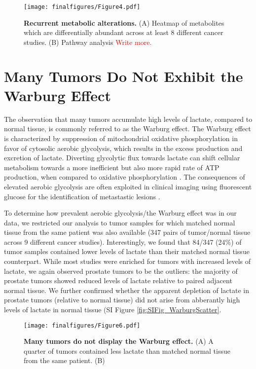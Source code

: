 \documentclass[10pt]{article}
\begin{document}
\begin{figure}[ht!]
  \centering
     \texttt{[image: finalfigures/Figure4.pdf]}
  \caption{\textbf{Recurrent metabolic alterations.} (A) Heatmap of metabolites which are differentially abundant across at least 8 different cancer studies. (B) Pathway analysis \textcolor{red}{Write more.}}
     \label{fig:Fig4}
\end{figure}

\section{Many Tumors Do Not Exhibit the Warburg Effect}
The observation that many tumors accumulate high levels of lactate, compared to normal tissue, is commonly referred to as the Warburg effect. The Warburg effect is characterized by suppression of mitochondrial oxidative phosphorylation in favor of cytosolic aerobic glycolysis, which results in the excess production and excretion of lactate. Diverting glycolytic flux towards lactate can shift cellular metabolism towards a more inefficient but also more rapid rate of ATP production, when compared to oxidative phosphorylation \cite{VanderHeiden2009}. The consequences of elevated aerobic glycolysis are often exploited in clinical imaging using fluorescent glucose for the identification of metastastic lesions \cite{CITE}.

To determine how prevalent aerobic glycolysis/the Warburg effect was in our data, we restricted our analysis to tumor samples for which matched normal tissue from the same patient was also available (347 pairs of tumor/normal tissue across 9 different cancer studies). Interestingly, we found that 84/347 (24\%) of tumor samples contained lower levels of lactate than their matched normal tissue counterpart. While most studies were enriched for tumors with increased levels of lactate, we again observed prostate tumors to be the outliers: the majority of prostate tumors showed reduced levels of lactate relative to paired adjacent normal tissue. We further confirmed whether the apparent depletion of lactate in prostate tumors (relative to normal tissue) did not arise from abberantly high levels of lactate in normal tissue (SI Figure \ref{fig:SIFig_WarburgScatter}. 

\begin{figure}[ht!]
  \centering
     \texttt{[image: finalfigures/Figure6.pdf]}
  \caption{\textbf{Many tumors do not display the Warburg effect.} (A) A quarter of tumors contained less lactate than matched normal tissue from the same patient. (B) }
     \label{fig:Fig6}
\end{figure}
\end{document}
